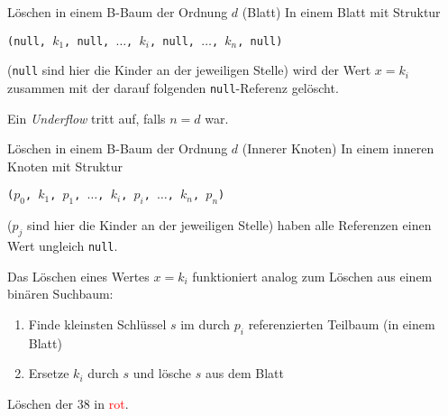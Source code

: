 \documentclass[german]{../spicker}
\begin{document}
\begin{algo}{Löschen in einem B-Baum der Ordnung $d$ (Blatt)}
    In einem Blatt mit Struktur
    \begin{center}
        \texttt{(null, $k_1$, null, $\ldots$, $k_i$, null, $\ldots$, $k_n$, null)}
    \end{center}
    (\texttt{null} sind hier die Kinder an der jeweiligen Stelle)
    wird der Wert $x = k_i$ zusammen mit der darauf folgenden \texttt{null}-Referenz gelöscht.

    Ein \emph{Underflow} tritt auf, falls $n=d$ war.
\end{algo}

\begin{algo}{Löschen in einem B-Baum der Ordnung $d$ (Innerer Knoten)}
    In einem inneren Knoten mit Struktur

    \begin{center}
        \texttt{($p_0$, $k_1$, $p_1$, $\ldots$, $k_i$, $p_i$, $\ldots$, $k_n$, $p_n$)}
    \end{center}

    ($p_j$ sind hier die Kinder an der jeweiligen Stelle)
    haben alle Referenzen einen Wert ungleich \texttt{null}.

    Das Löschen eines Wertes $x = k_i$ funktioniert analog zum Löschen aus einem binären Suchbaum:
    \begin{enumerate}
        \item Finde kleinsten Schlüssel $s$ im durch $p_i$ referenzierten Teilbaum (in einem Blatt)
        \item Ersetze $k_i$ durch $s$ und lösche $s$ aus dem Blatt
    \end{enumerate}

    Löschen der 38 in \textcolor{red}{rot}.

    \centering
    \vspace{1em}


\end{algo}
\end{document}
